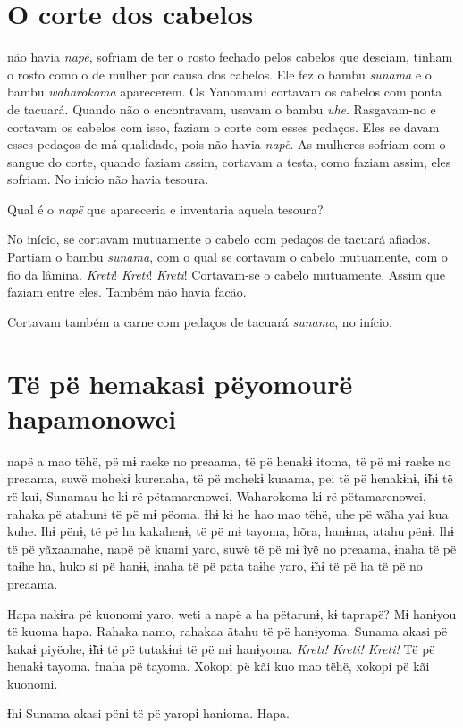 \chapter{O corte dos cabelos}
 
 não havia \textit{napë}, sofriam de ter o rosto fechado pelos
cabelos que desciam, tinham o rosto como o de mulher por causa dos
cabelos. Ele fez o bambu \textit{sunama} e o
bambu \textit{waharokoma} aparecerem. Os Yanomami cortavam os
cabelos com ponta de tacuará. Quando não o encontravam, usavam o
bambu \textit{uhe}. Rasgavam-no e cortavam os cabelos com isso, faziam o
corte com esses pedaços. Eles se davam esses pedaços de má qualidade,
pois não havia \textit{napë}. As mulheres sofriam com o sangue do corte,
quando faziam assim, cortavam a testa, como faziam assim, eles sofriam.
No início não havia tesoura. 

Qual é o \textit{napë} que apareceria e inventaria aquela tesoura?

No início, se cortavam mutuamente o cabelo com pedaços de tacuará
afiados. Partiam o bambu \textit{sunama}, com o qual se cortavam o cabelo
mutuamente, com o fio da lâmina. \textit{Kreti}! \textit{Kreti}! \textit{Kreti}! Cortavam-se o
cabelo mutuamente. Assim que faziam entre eles. Também não havia facão. 

Cortavam também a carne com pedaços de tacuará \textit{sunama}, no início.

\chapter[Të pë hemakasi pëyomou rë hapamonowei]{Të pë hemakasi pëyomou\break rë hapamonowei}
 
 napë a mao tëhë, pë mɨ raeke no preaama, të pë henakɨ itoma, të pë
mɨ raeke no preaama, suwë mohekɨ kurenaha, të pë mohekɨ kuaama, pei të
pë henakɨnɨ, ɨ̃hɨ të rë kui, Sunamau he kɨ rë pëtamarenowei, Waharokoma
kɨ rë pëtamarenowei, rahaka pë atahunɨ të pë mɨ pëoma. Ɨhɨ kɨ he hao mao
tëhë, uhe pë wãha yai kua kuhe. Ɨhɨ pënɨ, të pë ha kakahenɨ, të pë
mɨ tayoma, hõra, hanɨma, atahu pënɨ. Ɨhɨ të pë yãxaamahe, napë pë kuami
yaro, suwë të pë mɨ ĩyë no preaama, ɨnaha të pë taɨhe ha, huko si pë
hanɨɨ, ɨnaha të pë pata taɨhe yaro, ɨ̃hɨ të pë ha të pë no preaama. 

Hapa nakɨra pë kuonomi yaro, weti a napë a ha pëtarunɨ, kɨ taprapë?
 Mɨ hanɨyou të kuoma hapa. Rahaka namo, rahakaa ãtahu të pë hanɨyoma.
 Sunama akasi pë kakaɨ piyëohe, ɨ̃hɨ të pë tutakɨnɨ të pë mɨ hanɨyoma.
 \textit{Kreti! Kreti! Kreti!} Të pë henakɨ tayoma. Ɨnaha pë tayoma. Xokopi pë kãi
 kuo mao tëhë, xokopi pë kãi kuonomi. 

Ɨhɨ Sunama akasi pënɨ të pë yaropɨ hanɨoma. Hapa. 
